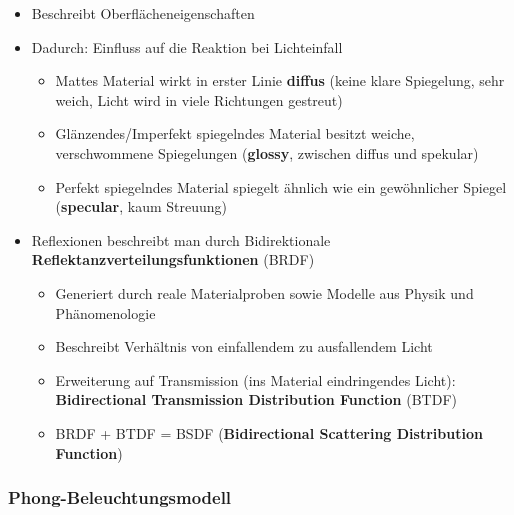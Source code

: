 \documentclass[10pt,a4paper]{article}
\begin{document}
	\begin{itemize}
		\item Beschreibt Oberflächeneigenschaften
		\item Dadurch: Einfluss auf die Reaktion bei Lichteinfall
		\begin{itemize}
			\item Mattes Material wirkt in erster Linie \textbf{diffus} (keine klare Spiegelung, sehr weich, Licht wird in viele Richtungen gestreut)
			\item Glänzendes/Imperfekt spiegelndes Material besitzt weiche, verschwommene Spiegelungen (\textbf{\glqq glossy\grqq}, zwischen diffus und spekular)
			\item Perfekt spiegelndes Material spiegelt ähnlich wie ein gewöhnlicher Spiegel (\textbf{\glqq specular\grqq}, kaum Streuung)
		\end{itemize}
		\item Reflexionen beschreibt man durch Bidirektionale \textbf{Reflektanzverteilungsfunktionen} (BRDF)
		\begin{itemize}
			\item Generiert durch reale Materialproben sowie Modelle aus Physik und Phänomenologie
			\item Beschreibt Verhältnis von einfallendem zu ausfallendem Licht
			\item Erweiterung auf Transmission (ins Material eindringendes Licht): \textbf{Bidirectional Transmission Distribution Function} (BTDF)
			\item BRDF + BTDF = BSDF (\textbf{Bidirectional Scattering Distribution Function})
		\end{itemize}
	\end{itemize}

	\subsubsection{Phong-Beleuchtungsmodell}
	\label{rt:ssub:phong_beleuchtungsmodell}
	
\end{document}
